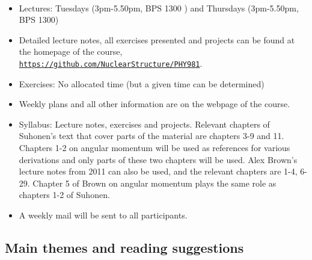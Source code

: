 \documentclass[%
twoside,                 %
final,                   %
10pt]{article}
\begin{document}
\paragraph{}
\begin{itemize}
\item Lectures: Tuesdays (3pm-5.50pm, BPS 1300 ) and Thursdays (3pm-5.50pm, BPS 1300)

\item Detailed lecture notes, all exercises presented and projects can be found at the homepage of the course, \href{{https://github.com/NuclearStructure/PHY981}}{\nolinkurl{https://github.com/NuclearStructure/PHY981}}.

\item Exercises: No allocated time (but a given time can be determined)

\item Weekly plans and all other information are on the webpage of the course.

\item Syllabus: Lecture notes, exercises and projects. Relevant chapters of Suhonen's text that cover parts of the material are chapters 3-9 and 11. Chapters 1-2 on angular momentum will be used as references for various derivations and only parts of these two chapters will be used. Alex Brown's lecture notes from 2011 can also be used, and the relevant chapters are 1-4, 6-29. Chapter 5 of Brown on angular momentum plays the same role as chapters 1-2 of Suhonen. 

\item A weekly mail will be sent to all participants. 
\end{itemize}

\noindent




\subsection*{Main themes and reading suggestions}

\end{document}
